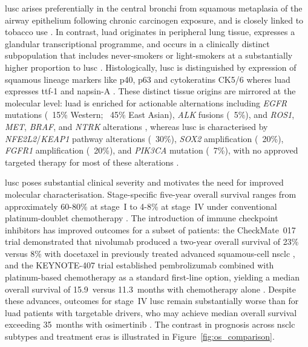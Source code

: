 \gls{lusc} arises preferentially in the central bronchi from squamous metaplasia of the airway epithelium following chronic carcinogen exposure, and is closely linked to tobacco use \parencite{Herbst2018, Mino-Kenudson2022-xp}. In contrast, \gls{luad} originates in peripheral lung tissue, expresses a glandular transcriptional programme, and occurs in a clinically distinct subpopulation that includes never-smokers or light-smokers at a substantially higher proportion to \gls{lusc} \parencite{Herbst2018}. Histologically, \gls{lusc} is distinguished by expression of squamous lineage markers like p40, p63 and cytokeratins CK5/6 wheres \gls{luad} expresses \gls{ttf-1} and napsin-A \parencite{Mino-Kenudson2022-xp}. These distinct tissue origins are mirrored at the molecular level: \gls{luad} is enriched for actionable alternations including \textit{EGFR} mutations (~15\% Western; ~45\% East Asian), \textit{ALK} fusions (~5\%), and \textit{ROS1}, \textit{MET}, \textit{BRAF}, and \textit{NTRK} alterations \parencite{Herbst2018}, whereas \gls{lusc} is characterised by \textit{NFE2L2}/\textit{KEAP1} pathway alterations (~30\%), \textit{SOX2} amplification (~20\%), \textit{FGFR1} amplification (~20\%), and \textit{PIK3CA} mutation (~7\%), with no approved targeted therapy for most of these alterations \parencite{Hammerman2012,Lau2022-hy}.

\gls{lusc} poses substantial clinical severity and motivates the need for improved molecular characterisation. Stage-specific five-year overall survival ranges from approximately 60-80\% at stage~I to 4-8\% at stage~IV under conventional platinum-doublet chemotherapy \parencite{Herbst2018, Lau2022-hy}. The introduction of immune checkpoint inhibitors has improved outcomes for a subset of patients: the CheckMate~017 trial demonstrated that nivolumab produced a two-year overall survival of 23\% versus 8\% with docetaxel in previously treated advanced squamous-cell \gls{nsclc} \parencite{Brahmer2015}, and the KEYNOTE-407 trial established pembrolizumab combined with platinum-based chemotherapy as a standard first-line option, yielding a median overall survival of 15.9~versus 11.3~months with chemotherapy alone \parencite{PazAres2018}. Despite these advances, outcomes for stage~IV \gls{lusc} remain substantially worse than for \gls{luad} patients with targetable drivers, who may achieve median overall survival exceeding 35~months with osimertinib
\parencite{Remon2024}. The contrast in prognosis across \gls{nsclc} subtypes and treatment eras is illustrated in Figure~\ref{fig:os_comparison}.

